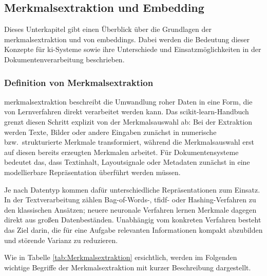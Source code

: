 \subsection{Merkmalsextraktion und Embedding}\label{subsec:merkmalsextraktion_embedding}

Dieses Unterkapitel gibt einen Überblick über die Grundlagen der \gls{merkmalsextraktion} und von \gls{embedding}s. Dabei werden die Bedeutung dieser Konzepte für \gls{ki}-Systeme sowie ihre Unterschiede und Einsatzmöglichkeiten in der Dokumentenverarbeitung beschrieben.

\subsubsection{Definition von Merkmalsextraktion}

\gls{merkmalsextraktion} beschreibt die Umwandlung roher Daten in eine Form, die von Lernverfahren direkt verarbeitet werden kann. Das scikit-learn-Handbuch grenzt diesen Schritt explizit von der Merkmalsauswahl ab: Bei der Extraktion werden Texte, Bilder oder andere Eingaben zunächst in numerische bzw.\ strukturierte Merkmale transformiert, während die Merkmalsauswahl erst auf diesen bereits erzeugten Merkmalen arbeitet. Für Dokumentensysteme bedeutet das, dass Textinhalt, Layoutsignale oder Metadaten zunächst in eine modellierbare Repräsentation überführt werden müssen. \cite{sklearn_feature_extraction,azure_document_intelligence_overview}

Je nach Datentyp kommen dafür unterschiedliche Repräsentationen zum Einsatz. In der Textverarbeitung zählen Bag-of-Words-, \acrshort{tfidf}- oder Hashing-Verfahren zu den klassischen Ansätzen; neuere neuronale Verfahren lernen Merkmale dagegen direkt aus großen Datenbeständen. Unabhängig vom konkreten Verfahren besteht das Ziel darin, die für eine Aufgabe relevanten Informationen kompakt abzubilden und störende Varianz zu reduzieren. \cite{manning2008irbook,stanford_tfidf,sklearn_feature_extraction} \\

\newpage

Wie in Tabelle \ref{tab:Merkmalsextraktion} ersichtlich, werden im Folgenden wichtige Begriffe der Merkmalsextraktion mit kurzer Beschreibung dargestellt.

